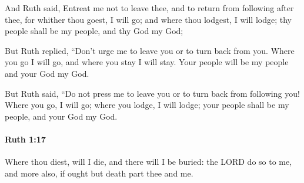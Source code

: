 			\begin{versebox}
					\item[BHS] 
					\item[LXX] 
					\item[ASV] And Ruth said, Entreat me not to leave thee, and to return from following after thee, for whither thou goest, I will go; and where thou lodgest, I will lodge; thy people shall be my people, and thy God my God;
					\item[NIV] But Ruth replied, “Don’t urge me to leave you or to turn back from you. Where you go I will go, and where you stay I will stay. Your people will be my people and your God my God.
					\item[NRSV] But Ruth said, “Do not press me to leave you or to turn back from following you! Where you go, I will go; where you lodge, I will lodge; your people shall be my people, and your God my God.
			\end{versebox}

		\paragraph{Ruth 1:17} %
			\label{RUTH-1-17}

			Where thou diest, will I die, and there will I be buried: the LORD do so to me, and more also, if ought but death part thee and me.

